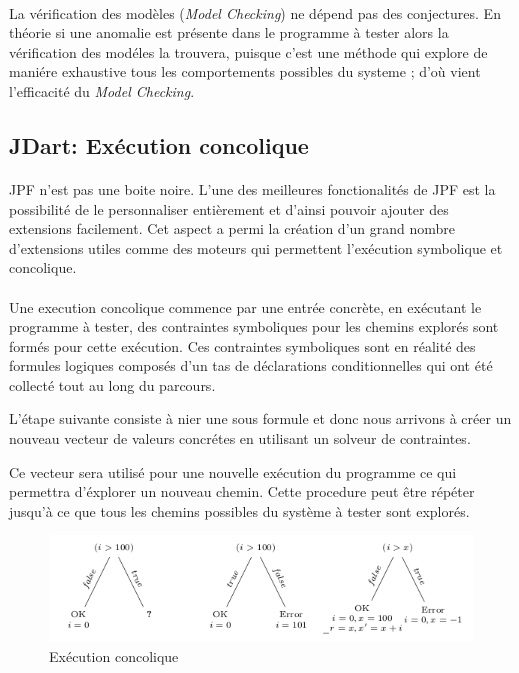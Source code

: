 			\paragraph{}
				La vérification des modèles (\textit{Model Checking}) ne dépend pas des conjectures. En théorie si une anomalie est présente dans le programme à tester
				alors la vérification des modéles la trouvera, puisque c'est une méthode qui explore de maniére exhaustive tous les comportements possibles du systeme ;
				d'où vient l'efficacité du \textit{Model Checking}.
		\subsection{JDart: Exécution concolique}
			\nocite{JDart}
			\nocite{JDart2}

			\paragraph{}
				\gls{JPF} n'est pas une boite noire. L'une des meilleures fonctionalités de \gls{JPF} est la possibilité de le personnaliser entièrement et d'ainsi pouvoir ajouter des extensions facilement.
				Cet aspect a permi la création d'un grand nombre d'extensions utiles comme des moteurs
				qui permettent l'exécution symbolique et concolique.

			\paragraph{}
				Une execution concolique commence par une entrée concrète, en exécutant le programme à tester, des contraintes symboliques pour les chemins explorés
				sont formés pour cette exécution. Ces contraintes symboliques sont en réalité des formules logiques composés d'un tas de déclarations conditionnelles
				qui ont été collecté tout au long du parcours.

				L'étape suivante consiste à nier une sous formule et donc nous arrivons à créer un nouveau vecteur de valeurs concrétes en utilisant un
				solveur de contraintes.

				Ce vecteur sera utilisé pour une nouvelle exécution du programme ce qui permettra d'éxplorer un nouveau chemin.
				Cette procedure peut être répéter jusqu'à ce que tous les chemins possibles du système à tester sont explorés.
				
			\begin{figure}[H]
				\centering
					\includegraphics[scale=0.5]{images/concolic.png}
				\caption{Exécution concolique}
			\end{figure}
				
